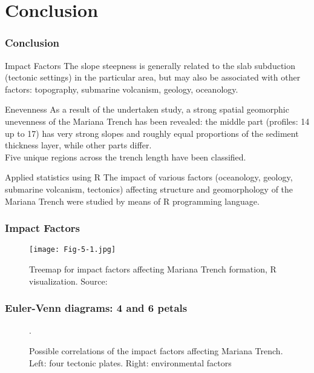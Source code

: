 \documentclass[pdflatex,compress,8pt,
	xcolor={dvipsnames,dvipsnames,svgnames,x11names,table},
	hyperref={colorlinks = true,breaklinks = true, urlcolor = NavyBlue, breaklinks = true}]{beamer}
\begin{document}
\section{Conclusion}
\begin{frame}\frametitle{Conclusion}

	\begin{exampleblock}{Impact Factors}
The slope steepness is generally related to the slab subduction (tectonic settings) in the particular area, but may also be associated with other factors: topography, submarine volcanism, geology, oceanology.
	\end{exampleblock}
	
	\begin{exampleblock}{Enevenness} As a result of the undertaken study, a strong spatial geomorphic unevenness of the Mariana Trench has been revealed: the middle part (profiles: 14 up to 17) has very strong slopes and roughly equal proportions of the sediment thickness layer, while other parts differ.\\ Five unique regions across the trench length have been classified.
	\end{exampleblock}
	
	\begin{alertblock}{Applied statistics using R}
	The impact of various factors (oceanology, geology, submarine volcanism, tectonics) affecting structure and geomorphology of the Mariana Trench were studied by means of R programming language.
	\end{alertblock}
\end{frame}

\begin{frame}\frametitle{Impact Factors}
\begin{figure}[H]
	\centering
		\texttt{[image: Fig-5-1.jpg]}\caption{Treemap for impact factors affecting Mariana Trench formation, R visualization. Source: \cite{Lemenkova201871}}
\end{figure}		
\end{frame}

\begin{frame}\frametitle{Euler-Venn diagrams: 4 and 6 petals}
\begin{figure}[H]
	\centering
			\hspace{3mm}
			\hspace{3mm}
	\caption{Possible correlations of the impact factors affecting Mariana Trench. \\Left: four tectonic plates. Right: environmental factors}.
\end{figure}
\end{frame}
\end{document}
